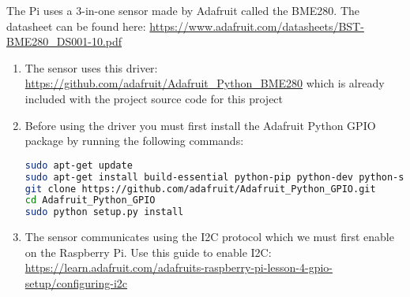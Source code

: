 \documentclass[a4paper,12pt]{article}
\begin{document}
The Pi uses a 3-in-one sensor made by Adafruit called the BME280. The datasheet can be found here: \href{https://www.adafruit.com/datasheets/BST-BME280\_DS001-10.pdf}{https://www.adafruit.com/datasheets/BST-BME280\_DS001-10.pdf}

\begin{enumerate}

\item The sensor uses this driver: \href{https://github.com/adafruit/Adafruit\_Python\_BME280}{https://github.com/adafruit/Adafruit\_Python\_BME280} which is already included with the project source code for this project
\item Before using the driver you must first install the Adafruit Python GPIO package by running the following commands:

\begin{lstlisting}[language=bash]
sudo apt-get update
sudo apt-get install build-essential python-pip python-dev python-smbus git
git clone https://github.com/adafruit/Adafruit_Python_GPIO.git
cd Adafruit_Python_GPIO
sudo python setup.py install
\end{lstlisting}

\item The sensor communicates using the I2C protocol which we must first enable on the Raspberry Pi. Use this guide to enable I2C: \href{https://learn.adafruit.com/adafruits-raspberry-pi-lesson-4-gpio-setup/configuring-i2c}{https://learn.adafruit.com/adafruits-raspberry-pi-lesson-4-gpio-setup/configuring-i2c}

\end{enumerate}
\end{document}
